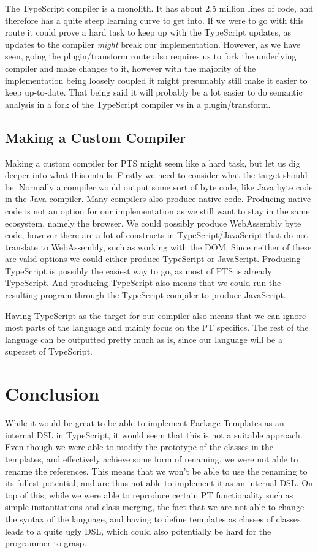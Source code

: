 The TypeScript compiler is a monolith.
It has about 2.5 million lines of code, and therefore has a quite steep learning curve to get into.
If we were to go with this route it could prove a hard task to keep up with the TypeScript updates, as updates to the compiler \textit{might} break our implementation.
However, as we have seen, going the plugin/transform route also requires us to fork the underlying compiler and make changes to it, however with the majority of the implementation being loosely coupled it might presumably still make it easier to keep up-to-date.
That being said it will probably be a lot easier to do semantic analysis in a fork of the TypeScript compiler vs in a plugin/transform.

\subsection{Making a Custom Compiler}\label{subsec:making-a-custom-compiler}

Making a custom compiler for PTS might seem like a hard task, but let us dig deeper into what this entails.
Firstly we need to consider what the target should be.
Normally a compiler would output some sort of byte code, like Java byte code in the Java compiler.
Many compilers also produce native code.
Producing native code is not an option for our implementation as we still want to stay in the same ecosystem, namely the browser.
We could possibly produce WebAssembly byte code, however there are a lot of constructs in TypeScript/JavaScript that do not translate to WebAssembly, such as working with the DOM\@.
Since neither of these are valid options we could either produce TypeScript or JavaScript.
Producing TypeScript is possibly the easiest way to go, as most of PTS is already TypeScript.
And producing TypeScript also means that we could run the resulting program through the TypeScript compiler to produce JavaScript.

Having TypeScript as the target for our compiler also means that we can ignore most parts of the language and mainly focus on the PT specifics.
The rest of the language can be outputted pretty much as is, since our language will be a superset of TypeScript.


\section{Conclusion}\label{sec:planning-conclusion}


While it would be great to be able to implement Package Templates as an internal DSL in TypeScript, it would seem that this is not a suitable approach.
Even though we were able to modify the prototype of the classes in the templates, and effectively achieve some form of renaming, we were not able to rename the references.
This means that we won't be able to use the renaming to its fullest potential, and are thus not able to implement it as an internal DSL\@.
On top of this, while we were able to reproduce certain PT functionality such as simple instantiations and class merging, the fact that we are not able to change the syntax of the language, and having to define templates as classes of classes leads to a quite ugly DSL, which could also potentially be hard for the programmer to grasp.

